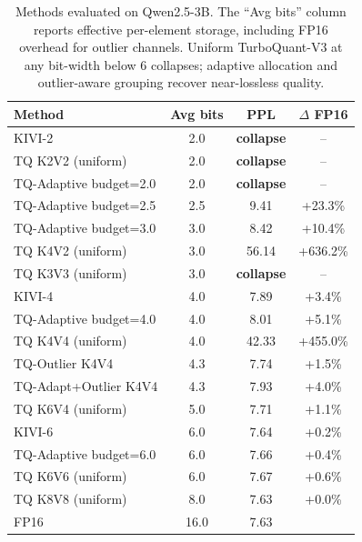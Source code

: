 \documentclass[11pt]{article}
\begin{document}
\begin{table}[t]
\centering
\caption{Methods evaluated on Qwen2.5-3B. The ``Avg bits'' column reports effective per-element storage, including FP16 overhead for outlier channels. Uniform TurboQuant-V3 at any bit-width below $6$ collapses; adaptive allocation and outlier-aware grouping recover near-lossless quality.}
\label{tab:qwen-rescue}
\small
\begin{tabular}{l c c c}
\toprule
Method & Avg bits & PPL & $\Delta$ FP16 \\
\midrule
KIVI-2 & 2.0 & \textbf{collapse} & -- \\
TQ K2V2 (uniform) & 2.0 & \textbf{collapse} & -- \\
TQ-Adaptive budget=2.0 & 2.0 & \textbf{collapse} & -- \\
TQ-Adaptive budget=2.5 & 2.5 & 9.41 & +23.3\% \\
TQ-Adaptive budget=3.0 & 3.0 & 8.42 & +10.4\% \\
TQ K4V2 (uniform) & 3.0 & 56.14 & +636.2\% \\
TQ K3V3 (uniform) & 3.0 & \textbf{collapse} & -- \\
KIVI-4 & 4.0 & 7.89 & +3.4\% \\
TQ-Adaptive budget=4.0 & 4.0 & 8.01 & +5.1\% \\
TQ K4V4 (uniform) & 4.0 & 42.33 & +455.0\% \\
TQ-Outlier K4V4 & 4.3 & 7.74 & +1.5\% \\
TQ-Adapt+Outlier K4V4 & 4.3 & 7.93 & +4.0\% \\
TQ K6V4 (uniform) & 5.0 & 7.71 & +1.1\% \\
KIVI-6 & 6.0 & 7.64 & +0.2\% \\
TQ-Adaptive budget=6.0 & 6.0 & 7.66 & +0.4\% \\
TQ K6V6 (uniform) & 6.0 & 7.67 & +0.6\% \\
TQ K8V8 (uniform) & 8.0 & 7.63 & +0.0\% \\
FP16 & 16.0 & 7.63 &  \\
\bottomrule
\end{tabular}
\end{table}
\end{document}
